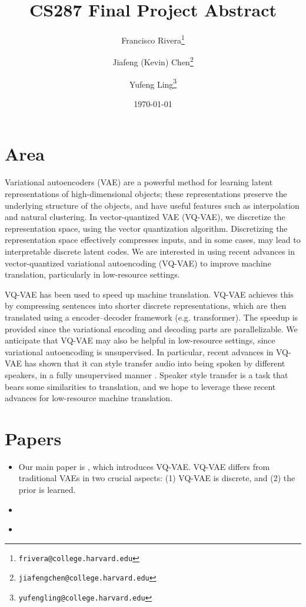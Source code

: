 \documentclass[11pt]{article}
\begin{document}
\title{CS287 Final Project Abstract}
\author{Francisco Rivera\thanks{\texttt{frivera@college.harvard.edu}} \and Jiafeng (Kevin) Chen\thanks{\texttt{jiafengchen@college.harvard.edu}} \and Yufeng Ling\thanks{\texttt{yufengling@college.harvard.edu}}}
\date{\today}

\maketitle

\section{Area}

Variational autoencoders (VAE) are a powerful method for learning latent
representations of high-dimensional objects; these representations preserve the
underlying structure of the objects, and have useful features such as
interpolation and natural clustering. In vector-quantized VAE (VQ-VAE), we
discretize the representation space, using the vector quantization algorithm.
Discretizing the representation space effectively compresses inputs, and in some
cases, may lead to interpretable discrete latent codes. We are interested in
using recent advances in vector-quantized variational autoencoding (VQ-VAE) to
improve machine translation, particularly in low-resource settings. 

VQ-VAE has been used \citep{kaiser2018fast} to speed up machine translation.
VQ-VAE achieves this by compressing sentences into shorter discrete
representations, which are then translated using a encoder--decoder framework
(e.g. transformer). The speedup is provided since the variational encoding and
decoding parts are parallelizable. We anticipate that VQ-VAE may also be helpful
in low-resource settings, since variational autoencoding is unsupervised. In
particular, recent advances in VQ-VAE has shown that it can style transfer audio
into being spoken by different speakers, in a fully unsupervised manner
\citep{van2017neural}. Speaker style transfer is a task that bears some
similarities to translation, and we hope to leverage these recent advances for
low-resource machine translation.%

\section{Papers}
\begin{itemize}
    \item Our main paper is \cite*{van2017neural}, which introduces VQ-VAE.
    VQ-VAE differs from traditional VAEs in two crucial aspects: (1) VQ-VAE is
    discrete, and (2) the prior is learned. 
    \item \cite*{kaiser2018fast}  
    \item \cite{guzman2019two}
\end{itemize}
\end{document}

